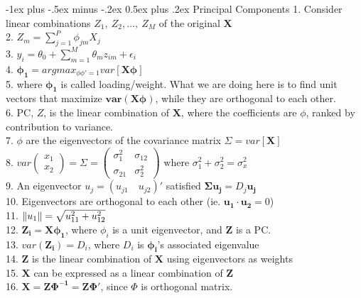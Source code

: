 \documentclass[10pt,landscape]{article}
\makeatletter
\renewcommand{\section}{\@startsection{section}{1}{0mm}%
                                {-1ex plus -.5ex minus -.2ex}%
                                {0.5ex plus .2ex}%
                                {\normalfont\large\bfseries}}
\makeatother
\begin{document}
\begin{multicols}{4}
\section{Principal Components}
1. Consider linear combinations $Z_1,\ Z_2, \ldots ,\ Z_M$ of the original $\boldsymbol{X}$\\
2. $Z_m = \sum_{j=1}^P \phi_{jm}X_j$\\
3. $y_i = \theta_0 + \sum_{m=1}^M \theta_m z_{im} + \epsilon_i$\\
4. $\boldsymbol{\phi_1} = argmax_{\phi \phi' = 1} var[\boldsymbol{X\phi}]$\\
5. where $\boldsymbol{\phi_1}$ is called loading/weight. What we are doing here is to find unit vectors that maximize $\boldsymbol{var(X\phi)}$, while they are orthogonal to each other.\\
6. PC, $Z$, is the linear combination of $\boldsymbol{X}$, where the coefficients are $\phi$, ranked by contribution to variance.\\
7. $\phi$ are the eigenvectors of the covariance matrix $\Sigma = var[\boldsymbol{X}]$\\
8. $var 
\begin{pmatrix}
x_1\\
x_2
\end{pmatrix}
= \Sigma = 
\begin{pmatrix}
    \sigma_1^2 & \sigma_{12}\\
    \sigma_{21} & \sigma_2^2
\end{pmatrix} \text{ where } \sigma_1^2 + \sigma_2^2 = \sigma_x^2$\\
9. An eigenvector $u_j = (u_{j1}\quad u_{j2})'$ satisfied $\boldsymbol{\Sigma u_j} = D_j \boldsymbol{u_j}$\\
10. Eigenvectors are orthogonal to each other (ie. $\boldsymbol{u_1} \cdot \boldsymbol{u_2} = 0$)\\
11. $\norm{u_1} = \sqrt{u_{11}^2 + u_{12}^2}$\\
12. $\boldsymbol{Z_i} = \boldsymbol{X\phi_1}$, where $\phi_i$ is a unit eigenvector, and $\boldsymbol{Z}$ is a PC.\\
13. $var(\boldsymbol{Z_i}) = D_i$, where $D_i$ is $\boldsymbol{\phi_i}$'s associated eigenvalue\\
14. $\boldsymbol{Z}$ is the linear combination of $\boldsymbol{X}$ using eigenvectors as weights\\
15. $\boldsymbol{X}$ can be expressed as a linear combination of $\boldsymbol{Z}$\\
16. $\boldsymbol{X = Z\Phi^{-1} = Z\Phi'}$, since $\Phi$ is orthogonal matrix.\\

\end{multicols}
\end{document}
